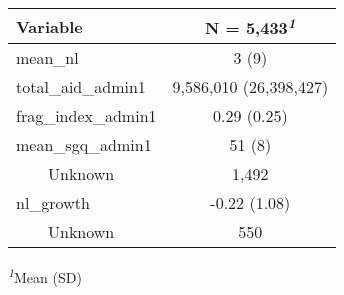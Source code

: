 \begin{table}[!t]
\fontsize{12.0pt}{14.4pt}\selectfont
\begin{tabular*}{\linewidth}{@{\extracolsep{\fill}}lc}
\toprule
\textbf{Variable} & \textbf{N = 5,433}\textsuperscript{\textit{1}} \\ 
\midrule\addlinespace[2.5pt]
mean\_nl & 3 (9) \\ 
total\_aid\_admin1 & 9,586,010 (26,398,427) \\ 
frag\_index\_admin1 & 0.29 (0.25) \\ 
mean\_sgq\_admin1 & 51 (8) \\ 
    Unknown & 1,492 \\ 
nl\_growth & -0.22 (1.08) \\ 
    Unknown & 550 \\ 
\bottomrule
\end{tabular*}
\begin{minipage}{\linewidth}
\textsuperscript{\textit{1}}Mean (SD)\\
\end{minipage}
\end{table}

